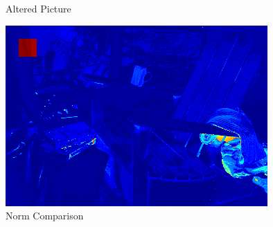 \documentclass{beamer}
\begin{document}
\begin{frame}
\begin{figure}[ht]
\begin{minipage}[b]{0.32\linewidth}
      \caption{Altered Picture}
    \end{minipage}
    \hfill
    \begin{minipage}[b]{0.32\linewidth}
      \centering
      \includegraphics[width=\textwidth]{./Images/ChangeDetect/ChairArtifact/ChangesXtoY.png}
      \caption{Norm Comparison}
    \end{minipage}
  \end{figure}
\end{frame}

\end{document}
